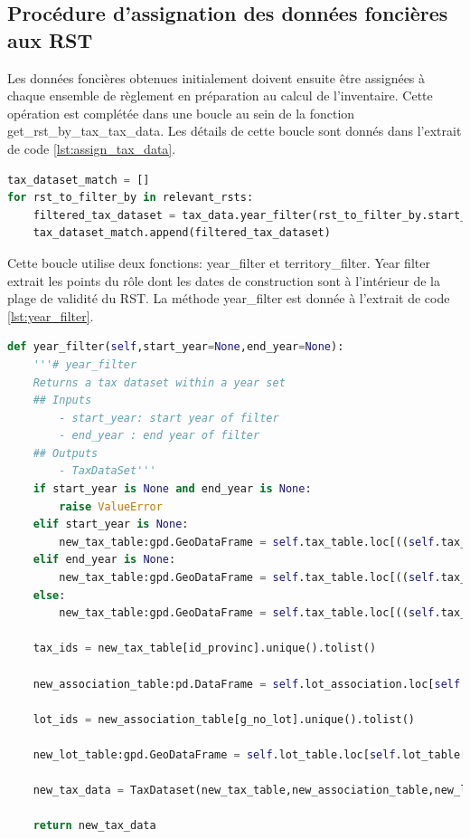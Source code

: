     \subsection{Procédure d'assignation des données foncières aux RST}
        Les données foncières obtenues initialement doivent ensuite être assignées à chaque ensemble de règlement en préparation au calcul de l'inventaire. Cette opération est complétée dans une boucle au sein de la fonction get\_rst\_by\_tax\_tax\_data. Les détails de cette boucle sont donnés dans l'extrait de code \ref{lst:assign_tax_data}.
\begin{lstlisting}[language=Python, caption=Procédure d'assignation du rôle foncier aux RST,label=lst:assign_tax_data]
tax_dataset_match = []
for rst_to_filter_by in relevant_rsts:
    filtered_tax_dataset = tax_data.year_filter(rst_to_filter_by.start_year,rst_to_filter_by.end_year).territory_filter(rst_to_filter_by.territory_info)
    tax_dataset_match.append(filtered_tax_dataset)
\end{lstlisting}
        Cette boucle utilise deux fonctions: year\_filter et territory\_filter. Year filter extrait les points du rôle dont les dates de construction sont à l'intérieur de la plage de validité du \ac{RST}. La méthode year\_filter est donnée à l'extrait de code \ref{lst:year_filter}.
\begin{lstlisting}[language=Python, caption=Méthode year\_filter, label=lst:year_filter]
def year_filter(self,start_year=None,end_year=None):
    '''# year_filter
    Returns a tax dataset within a year set
    ## Inputs
        - start_year: start year of filter
        - end_year : end year of filter
    ## Outputs
        - TaxDataSet'''
    if start_year is None and end_year is None:
        raise ValueError
    elif start_year is None:
        new_tax_table:gpd.GeoDataFrame = self.tax_table.loc[((self.tax_table[rl0307a]<= end_year))]
    elif end_year is None:
        new_tax_table:gpd.GeoDataFrame = self.tax_table.loc[((self.tax_table[rl0307a]>= start_year))]
    else:
        new_tax_table:gpd.GeoDataFrame = self.tax_table.loc[((self.tax_table[rl0307a]>= start_year) & (self.tax_table[rl0307a]<= end_year))].copy()
    
    tax_ids = new_tax_table[id_provinc].unique().tolist()
    
    new_association_table:pd.DataFrame = self.lot_association.loc[self.lot_association[id_provinc].isin(tax_ids)].copy()
    
    lot_ids = new_association_table[g_no_lot].unique().tolist()
    
    new_lot_table:gpd.GeoDataFrame = self.lot_table.loc[self.lot_table[g_no_lot].isin(lot_ids)].copy()
    
    new_tax_data = TaxDataset(new_tax_table,new_association_table,new_lot_table)
    
    return new_tax_data
\end{lstlisting}
